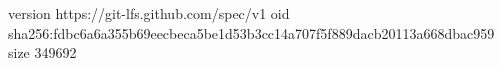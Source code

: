 version https://git-lfs.github.com/spec/v1
oid sha256:fdbc6a6a355b69eecbeca5be1d53b3cc14a707f5f889dacb20113a668dbac959
size 349692
